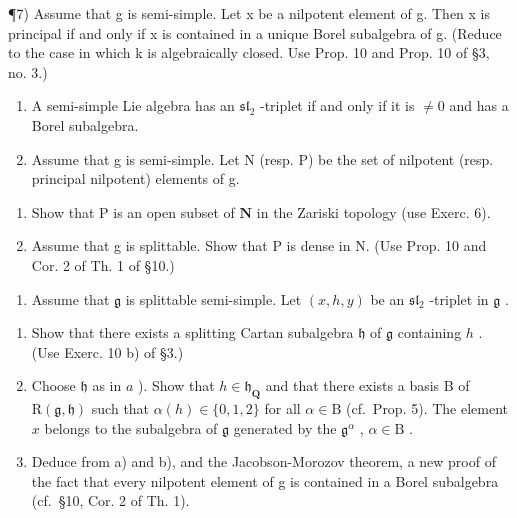 ¶7) Assume that g is semi-simple. Let x be a nilpotent element of g. Then x is principal if and only if x is contained in a unique Borel subalgebra of g. (Reduce to the case in which k is algebraically closed. Use Prop. 10 and Prop. 10 of §3, no. 3.)

\begin{enumerate}
\def\labelenumi{\arabic{enumi})}
\setcounter{enumi}{7}
\item
  A semi-simple Lie algebra has an \(\mathfrak{sl}_2\) -triplet if and only if it is \(\neq 0\) and has a Borel subalgebra.
\item
  Assume that g is semi-simple. Let N (resp. P) be the set of nilpotent (resp. principal nilpotent) elements of g.
\end{enumerate}

\begin{enumerate}
\def\labelenumi{\alph{enumi})}
\item
  Show that \(\mathrm{P}\) is an open subset of \(\mathbf{N}\) in the Zariski topology (use Exerc. 6).
\item
  Assume that g is splittable. Show that P is dense in N. (Use Prop. 10 and Cor. 2 of Th. 1 of §10.)
\end{enumerate}

\begin{enumerate}
\def\labelenumi{\arabic{enumi})}
\setcounter{enumi}{9}
\tightlist
\item
  Assume that \(\mathfrak{g}\) is splittable semi-simple. Let \((x,h,y)\) be an \(\mathfrak{sl}_2\) -triplet in \(\mathfrak{g}\) .
\end{enumerate}

\begin{enumerate}
\def\labelenumi{\alph{enumi})}
\item
  Show that there exists a splitting Cartan subalgebra \(\mathfrak{h}\) of \(\mathfrak{g}\) containing \(h\) . (Use Exerc. 10 b) of §3.)
\item
  Choose \(\mathfrak{h}\) as in \(a\) ). Show that \(h \in \mathfrak{h}_{\mathbf{Q}}\) and that there exists a basis B of \(\mathrm{R}(\mathfrak{g}, \mathfrak{h})\) such that \(\alpha(h) \in \{0, 1, 2\}\) for all \(\alpha \in \mathrm{B}\) (cf.~Prop. 5). The element \(x\) belongs to the subalgebra of \(\mathfrak{g}\) generated by the \(\mathfrak{g}^{\alpha}\) , \(\alpha \in \mathrm{B}\) .
\item
  Deduce from a) and b), and the Jacobson-Morozov theorem, a new proof of the fact that every nilpotent element of g is contained in a Borel subalgebra (cf.~§10, Cor. 2 of Th. 1).
\end{enumerate}

